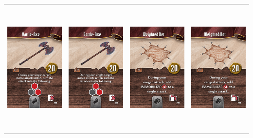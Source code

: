\documentclass{minimal}
\begin{document}
{\begin{longtable}{llll}
\includegraphics[width=44mm,height=68mm]{./15-21/gh-018-battle-axe.png} &
\includegraphics[width=44mm,height=68mm]{./15-21/gh-018-battle-axe.png} &
\includegraphics[width=44mm,height=68mm]{./15-21/gh-019-weighted-net.png} &
\includegraphics[width=44mm,height=68mm]{./15-21/gh-019-weighted-net.png}\\ 

\end{longtable}}
\end{document}
